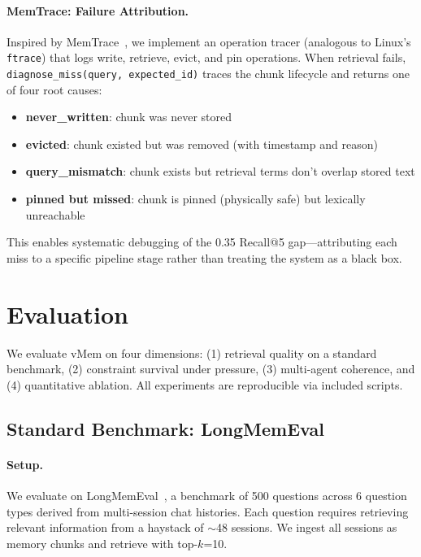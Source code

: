 \documentclass[10pt,twocolumn]{article}
\begin{document}
\paragraph{MemTrace: Failure Attribution.} Inspired by MemTrace~\cite{memtrace2026}, we implement an operation tracer (analogous to Linux's \texttt{ftrace}) that logs write, retrieve, evict, and pin operations. When retrieval fails, \texttt{diagnose\_miss(query, expected\_id)} traces the chunk lifecycle and returns one of four root causes:
\begin{itemize}[leftmargin=*,nosep]
  \item \textbf{never\_written}: chunk was never stored
  \item \textbf{evicted}: chunk existed but was removed (with timestamp and reason)
  \item \textbf{query\_mismatch}: chunk exists but retrieval terms don't overlap stored text
  \item \textbf{pinned but missed}: chunk is pinned (physically safe) but lexically unreachable
\end{itemize}
This enables systematic debugging of the 0.35 Recall@5 gap---attributing each miss to a specific pipeline stage rather than treating the system as a black box.

\section{Evaluation}
\label{sec:eval}

We evaluate vMem on four dimensions: (1) retrieval quality on a standard benchmark, (2) constraint survival under pressure, (3) multi-agent coherence, and (4) quantitative ablation. All experiments are reproducible via included scripts.

\subsection{Standard Benchmark: LongMemEval}

\paragraph{Setup.} We evaluate on LongMemEval~\cite{longmemeval2024}, a benchmark of 500 questions across 6 question types derived from multi-session chat histories. Each question requires retrieving relevant information from a haystack of $\sim$48 sessions. We ingest all sessions as memory chunks and retrieve with top-$k$=10.
\end{document}
